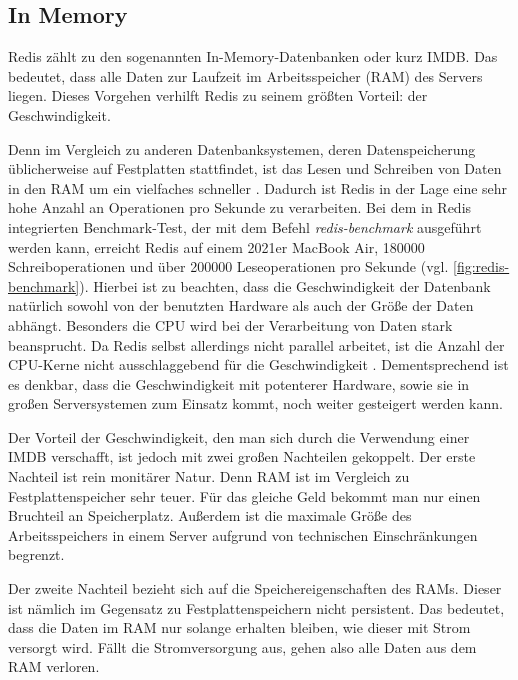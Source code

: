 
\subsection{In Memory}
Redis zählt zu den sogenannten In-Memory-Datenbanken oder kurz IMDB. 
Das bedeutet, dass alle Daten zur Laufzeit im Arbeitsspeicher (RAM) des Servers liegen.
Dieses Vorgehen verhilft Redis zu seinem größten Vorteil: der Geschwindigkeit.

Denn im Vergleich zu anderen Datenbanksystemen, deren Datenspeicherung üblicherweise auf Festplatten stattfindet, ist das Lesen und Schreiben von Daten in den RAM um ein vielfaches schneller \cite{VL_Rechnerarchitektur}.
Dadurch ist Redis in der Lage eine sehr hohe Anzahl an Operationen pro Sekunde zu verarbeiten.
Bei dem in Redis integrierten Benchmark-Test, der mit dem Befehl \textit{redis-benchmark} ausgeführt werden kann, erreicht Redis auf einem 2021er MacBook Air, 180000 Schreiboperationen und über 200000 Leseoperationen pro Sekunde (vgl. \autoref{fig:redis-benchmark}).
Hierbei ist zu beachten, dass die Geschwindigkeit der Datenbank natürlich sowohl von der benutzten Hardware als auch der Größe der Daten abhängt.
Besonders die CPU wird bei der Verarbeitung von Daten stark beansprucht. Da Redis selbst allerdings nicht parallel arbeitet, ist die Anzahl der CPU-Kerne nicht ausschlaggebend für die Geschwindigkeit \cite{Redis-Docs-Benchmarks}.
Dementsprechend ist es denkbar, dass die Geschwindigkeit mit potenterer Hardware, sowie sie in großen Serversystemen zum Einsatz kommt, noch weiter gesteigert werden kann.

Der Vorteil der Geschwindigkeit, den man sich durch die Verwendung einer IMDB verschafft, ist jedoch mit zwei großen Nachteilen gekoppelt.
Der erste Nachteil ist rein monitärer Natur. 
Denn RAM ist im Vergleich zu Festplattenspeicher sehr teuer. Für das gleiche Geld bekommt man nur einen Bruchteil an Speicherplatz.
Außerdem ist die maximale Größe des Arbeitsspeichers in einem Server aufgrund von technischen Einschränkungen begrenzt.

Der zweite Nachteil bezieht sich auf die Speichereigenschaften des RAMs.
Dieser ist nämlich im Gegensatz zu Festplattenspeichern nicht persistent.
Das bedeutet, dass die Daten im RAM nur solange erhalten bleiben, wie dieser mit Strom versorgt wird.
Fällt die Stromversorgung aus, gehen also alle Daten aus dem RAM verloren. 